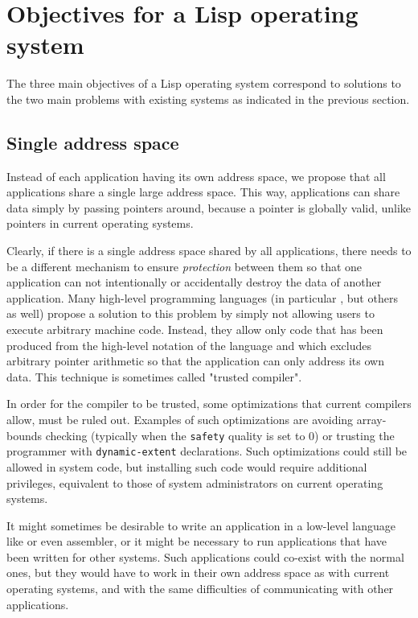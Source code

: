 \section{Objectives for a Lisp operating system}

The three main objectives of a Lisp operating system correspond to
solutions to the two main problems with existing systems as indicated
in the previous section.

\subsection{Single address space}

Instead of each application having its own address space, we propose
that all applications share a single large address space.  This way,
applications can share data simply by passing pointers around,
because a pointer is globally valid, unlike pointers in current
operating systems. 

Clearly, if there is a single address space shared by all
applications, there needs to be a different mechanism to ensure
\emph{protection} between them so that one application can not
intentionally or accidentally destroy the data of another application.
Many high-level programming languages (in particular \lisp{}, but
others as well) propose a solution to this problem by simply not
allowing users to execute arbitrary machine code.  Instead, they allow
only code that has been produced from the high-level notation of the
language and which excludes arbitrary pointer arithmetic so that the
application can only address its own data.  This technique is
sometimes called "trusted compiler".

In order for the compiler to be trusted, some optimizations that
current \commonlisp{} compilers allow, must be ruled out.  Examples of
such optimizations are avoiding array-bounds checking (typically when
the \texttt{safety} quality is set to $0$) or trusting the programmer
with \texttt{dynamic-extent} declarations.  Such optimizations could
still be allowed in system code, but installing such code would
require additional privileges, equivalent to those of system
administrators on current operating systems.

It might sometimes be desirable to write an application in a
low-level language like \clanguage{} or even assembler, or it might be
necessary to run applications that have been written for other
systems.  Such applications could co-exist with the normal ones, but
they would have to work in their own address space as with current
operating systems, and with the same difficulties of communicating
with other applications.  

